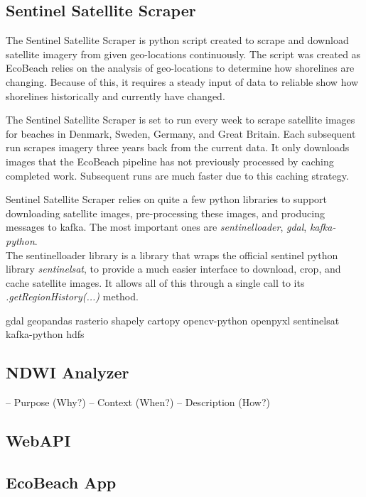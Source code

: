 \subsection{Sentinel Satellite Scraper}\label{subsec:sentinel-satellite-scraper}

The Sentinel Satellite Scraper is python script created to scrape and download satellite imagery from given geo-locations continuously. The script was created as EcoBeach relies on the analysis of geo-locations to determine how shorelines are changing. Because of this, it requires a steady input of data to reliable show how shorelines historically and currently have changed.

The Sentinel Satellite Scraper is set to run every week to scrape satellite images for beaches in Denmark, Sweden, Germany, and Great Britain. Each subsequent run scrapes imagery three years back from the current data. It only downloads images that the EcoBeach pipeline has not previously processed by caching completed work. Subsequent runs are much faster due to this caching strategy.

Sentinel Satellite Scraper relies on quite a few python libraries to support downloading satellite images, pre-processing these images, and producing messages to kafka. The most important ones are \emph{sentinelloader}, \emph{gdal}, \emph{kafka-python}.\\
The sentinelloader library is a library that wraps the official sentinel python library \emph{sentinelsat}, to provide a much easier interface to download, crop, and cache satellite images. It allows all of this through a single call to its \emph{.getRegionHistory(...)} method.



gdal
geopandas
rasterio
shapely
cartopy
opencv-python
openpyxl
sentinelsat
kafka-python
hdfs

\subsection{NDWI Analyzer}\label{subsec:ndwi-analyzer}

– Purpose (Why?)
– Context (When?)
– Description (How?)

\subsection{WebAPI}

\subsection{EcoBeach App}





